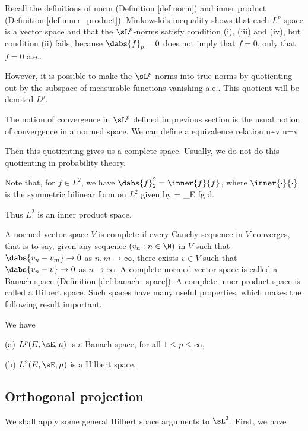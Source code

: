 Recall the definitions of norm (Definition \ref{def:norm}) and inner product (Definition \ref{def:inner_product}). Minkowski's inequality shows that each $L^p$ space is a vector space and that the $\sL^p$-norms satisfy condition (i), (iii) and (iv), but condition (ii) fails, because $\dabs{f}_p = 0$ does not imply that $f = 0$, only that $f = 0$ a.e..

However, it is possible to make the $\sL^p$-norms into true norms by quotienting out by the subspace of measurable functions vanishing a.e.. This quotient will be denoted $L^p$.

The notion of convergence in $\sL^p$ defined in previous section is the usual notion of convergence in a normed space. We can define a equivalence relation
\be
u\sim v \quad\lra \quad u=v 
\ee

Then this quotienting gives us a complete space. Usually, we do not do this quotienting in probability theory. %

Note that, for $f \in L^2$, we have $\dabs{f}^2_2 = \inner{f}{f}$, where $\inner{\cdot}{\cdot}$ is the symmetric bilinear form on $L^2$ given by
\be
{} = \int_E fg d\mu.
\ee

Thus $L^2$ is an inner product space.

A normed vector space $V$ is complete if every Cauchy sequence in $V$ converges, that is to say, given any sequence $(v_n : n \in \N)$ in $V$ such that $\dabs{v_n - v_m} \to 0$ as $n,m \to \infty$, there exists $v \in V$ such that $\dabs{v_n-v} \to 0$ as $n \to \infty$. A complete normed vector space is called a Banach space (Definition \ref{def:banach_space}). A complete inner product space is called a Hilbert space. Such spaces have many useful properties, which makes the following result important.

\begin{corollary}
We have
\ben
\item [(a)] $L^p(E,\sE,\mu)$ is a Banach space, for all $1 \leq p \leq \infty$,
\item [(b)] $L^2(E,\sE,\mu)$ is a Hilbert space.
\een
\end{corollary}


\subsection{Orthogonal projection}

We shall apply some general Hilbert space arguments to $\sL^2$. First, we have

